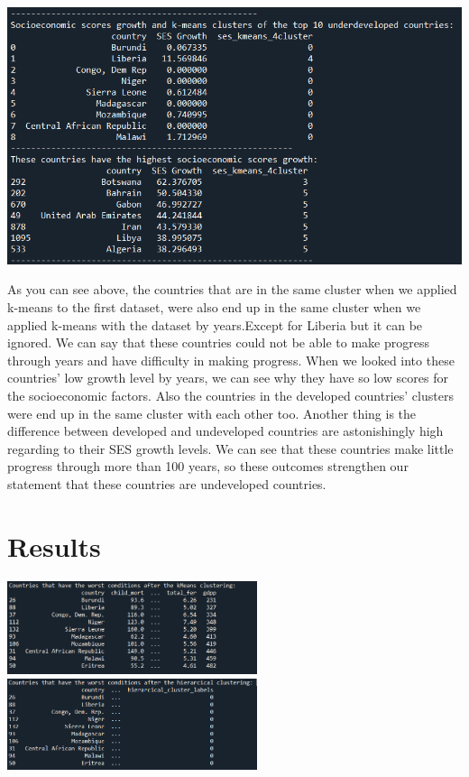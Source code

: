 \documentclass[onecolumn]{article}
\begin{document}
\begin{center}
    \includegraphics[scale=0.70]{ses.PNG}
\end{center}

As you can see above, the countries that are in the same cluster when we applied k-means to the first dataset, were also end up in the same cluster when we applied k-means with the dataset by years.Except for Liberia but it can be ignored. We can say that these countries could not be able to make progress through years and have difficulty in making progress. When we looked into these countries' low growth level by years, we can see why they have so low scores for the socioeconomic factors. Also the countries in the developed countries' clusters were end up in the same cluster with each other too. Another thing is the difference between developed and undeveloped countries are astonishingly high regarding to their SES growth levels. We can see that these countries make little progress through more than 100 years, so these outcomes strengthen our statement that these countries are undeveloped countries.
\section{Results}

\begin{center}
    \includegraphics[width=0.55\textwidth]{10c.png}
    \includegraphics[width=0.55\textwidth]{hier3.png}  
\end{center}
\end{document}
